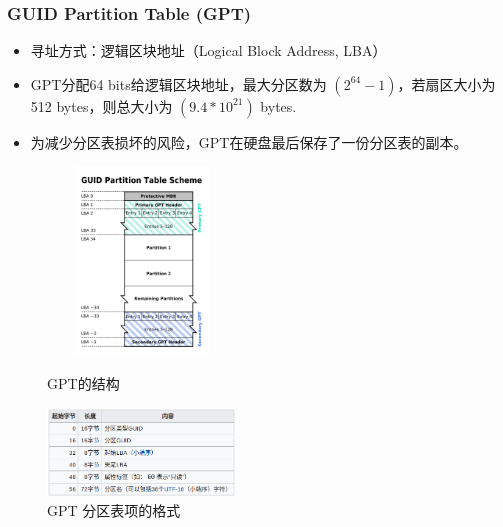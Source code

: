 \documentclass{beamer}
\begin{document}
\begin{frame}
    \frametitle{GUID Partition Table (GPT)}
    \footnotesize
    \begin{itemize}
        \item 寻址方式：逻辑区块地址（Logical Block Address, LBA）
        \item GPT分配64 bits给逻辑区块地址，最大分区数为 $(2^{64} -1)$，若扇区大小为512 bytes，则总大小为 $(9.4 * 10^{21})$ bytes.
        \item 为减少分区表损坏的风险，GPT在硬盘最后保存了一份分区表的副本。
    \end{itemize}

    \begin{figure}[htbp]
    \centering
    \begin{minipage}[t]{0.48\textwidth}
    \centering
    \includegraphics[width=5cm, height=5cm]{images/GUID_Partition_Table_Scheme.png}
    \caption{GPT的结构}
    \end{minipage}
    \begin{minipage}[t]{0.48\textwidth}
    \centering
    \includegraphics[width=5cm]{images/gpt_entry_format.png}
    \caption{GPT 分区表项的格式}
    \end{minipage}
    \end{figure}
\end{frame}
\end{document}
